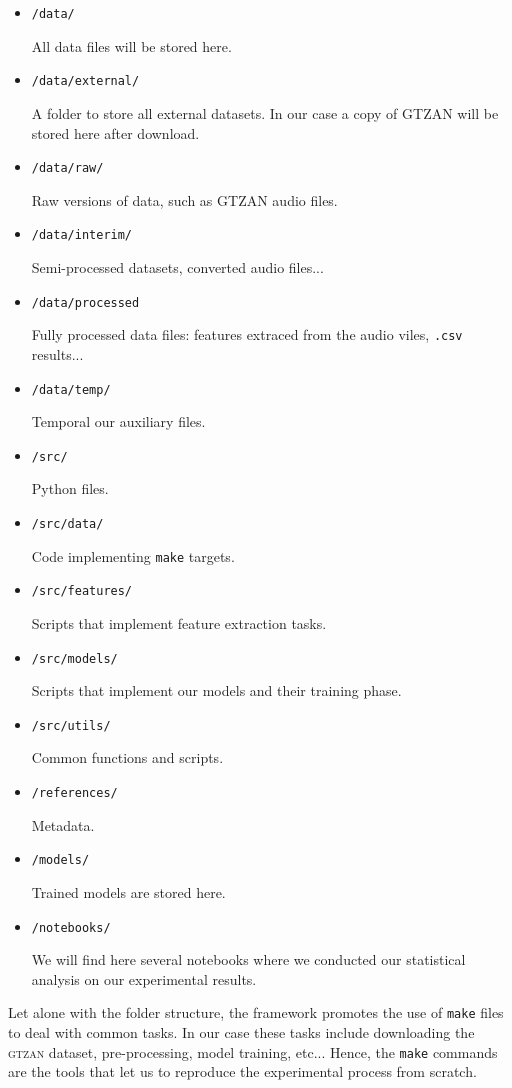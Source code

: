\begin{itemize}
  \item {
    \texttt{/data/}

    All data files will be stored here.
  }
  \item {
    \texttt{/data/external/}

    A folder to store all external datasets. In our case a copy of GTZAN will be stored here after download.
  }
  \item {
    \texttt{/data/raw/}

    Raw versions of data, such as GTZAN audio files.
  }
  \item {
    \texttt{/data/interim/}

    Semi-processed datasets, converted audio files...
  }
  \item {
    \texttt{/data/processed}

    Fully processed data files: features extraced from the audio viles, \texttt{.csv} results...
  }
  \item {
    \texttt{/data/temp/}

    Temporal our auxiliary files.
  }
  \item {
    \texttt{/src/}

    Python files.
  }
  \item {
    \texttt{/src/data/}

    Code implementing \texttt{make} targets.
  }
  \item {
    \texttt{/src/features/}

    Scripts that implement feature extraction tasks.
  }
  \item {
    \texttt{/src/models/}

    Scripts that implement our models and their training phase.
  }
  \item {
    \texttt{/src/utils/}

    Common functions and scripts.
  }
  \item {
    \texttt{/references/}

    Metadata.
  }
  \item {
    \texttt{/models/}

    Trained models are stored here.
  }
  \item {
    \texttt{/notebooks/}

    We will find here several notebooks where we conducted our statistical analysis on our experimental results.
  }
\end{itemize}

Let alone with the folder structure, the framework promotes the use of \texttt{make} files to deal with common tasks. In our case these tasks include downloading the \textsc{gtzan} dataset, pre-processing, model training, etc... Hence, the \texttt{make} commands are the tools that let us to reproduce the experimental process from scratch.


